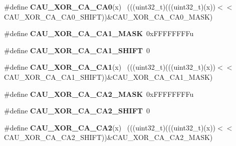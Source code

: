 \begin{DoxyCompactItemize}
\item 
\hypertarget{group___c_a_u___register___masks_gaa1fb0a99ff29c695779a5048b3ee9128}{}\#define {\bfseries C\+A\+U\+\_\+\+X\+O\+R\+\_\+\+C\+A\+\_\+\+C\+A0}(x)                                            ~(((uint32\+\_\+t)(((uint32\+\_\+t)(x))$<$$<$C\+A\+U\+\_\+\+X\+O\+R\+\_\+\+C\+A\+\_\+\+C\+A0\+\_\+\+S\+H\+I\+F\+T))\&C\+A\+U\+\_\+\+X\+O\+R\+\_\+\+C\+A\+\_\+\+C\+A0\+\_\+\+M\+A\+S\+K)\label{group___c_a_u___register___masks_gaa1fb0a99ff29c695779a5048b3ee9128}

\item 
\hypertarget{group___c_a_u___register___masks_ga9aaaf6dc6a0bb9f82e566fbc29dc9f2c}{}\#define {\bfseries C\+A\+U\+\_\+\+X\+O\+R\+\_\+\+C\+A\+\_\+\+C\+A1\+\_\+\+M\+A\+S\+K}~0x\+F\+F\+F\+F\+F\+F\+F\+Fu\label{group___c_a_u___register___masks_ga9aaaf6dc6a0bb9f82e566fbc29dc9f2c}

\item 
\hypertarget{group___c_a_u___register___masks_gae0c5144e0bc6b1bc363388cc0724ad4a}{}\#define {\bfseries C\+A\+U\+\_\+\+X\+O\+R\+\_\+\+C\+A\+\_\+\+C\+A1\+\_\+\+S\+H\+I\+F\+T}~0\label{group___c_a_u___register___masks_gae0c5144e0bc6b1bc363388cc0724ad4a}

\item 
\hypertarget{group___c_a_u___register___masks_gaf09e50e24d96bd92db37a730123748c0}{}\#define {\bfseries C\+A\+U\+\_\+\+X\+O\+R\+\_\+\+C\+A\+\_\+\+C\+A1}(x)                                            ~(((uint32\+\_\+t)(((uint32\+\_\+t)(x))$<$$<$C\+A\+U\+\_\+\+X\+O\+R\+\_\+\+C\+A\+\_\+\+C\+A1\+\_\+\+S\+H\+I\+F\+T))\&C\+A\+U\+\_\+\+X\+O\+R\+\_\+\+C\+A\+\_\+\+C\+A1\+\_\+\+M\+A\+S\+K)\label{group___c_a_u___register___masks_gaf09e50e24d96bd92db37a730123748c0}

\item 
\hypertarget{group___c_a_u___register___masks_ga710ad3a23664ea7f219a37d7a5402362}{}\#define {\bfseries C\+A\+U\+\_\+\+X\+O\+R\+\_\+\+C\+A\+\_\+\+C\+A2\+\_\+\+M\+A\+S\+K}~0x\+F\+F\+F\+F\+F\+F\+F\+Fu\label{group___c_a_u___register___masks_ga710ad3a23664ea7f219a37d7a5402362}

\item 
\hypertarget{group___c_a_u___register___masks_gaaa37d49b203514cc1d0d59ef3dc5d4b0}{}\#define {\bfseries C\+A\+U\+\_\+\+X\+O\+R\+\_\+\+C\+A\+\_\+\+C\+A2\+\_\+\+S\+H\+I\+F\+T}~0\label{group___c_a_u___register___masks_gaaa37d49b203514cc1d0d59ef3dc5d4b0}

\item 
\hypertarget{group___c_a_u___register___masks_ga26e5d37ff6911a7b48ee487d10f68089}{}\#define {\bfseries C\+A\+U\+\_\+\+X\+O\+R\+\_\+\+C\+A\+\_\+\+C\+A2}(x)                                            ~(((uint32\+\_\+t)(((uint32\+\_\+t)(x))$<$$<$C\+A\+U\+\_\+\+X\+O\+R\+\_\+\+C\+A\+\_\+\+C\+A2\+\_\+\+S\+H\+I\+F\+T))\&C\+A\+U\+\_\+\+X\+O\+R\+\_\+\+C\+A\+\_\+\+C\+A2\+\_\+\+M\+A\+S\+K)\label{group___c_a_u___register___masks_ga26e5d37ff6911a7b48ee487d10f68089}


\end{DoxyCompactItemize}
